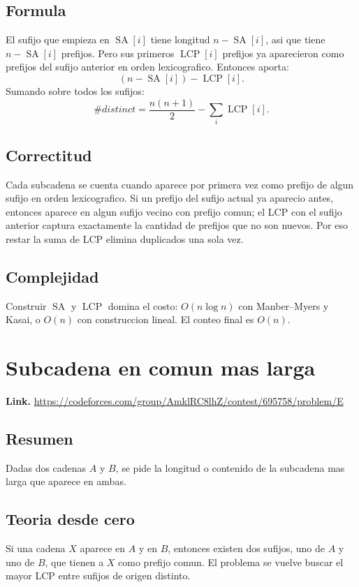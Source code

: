 \documentclass[10pt]{article}
\newcommand{\bigO}{O}
\newcommand{\SA}{\operatorname{SA}}
\newcommand{\LCP}{\operatorname{LCP}}
\begin{document}
\subsection*{Formula}
El sufijo que empieza en $\SA[i]$ tiene longitud $n-\SA[i]$, asi que tiene
$n-\SA[i]$ prefijos. Pero sus primeros $\LCP[i]$ prefijos ya aparecieron como
prefijos del sufijo anterior en orden lexicografico. Entonces aporta:
\[
(n-\SA[i])-\LCP[i].
\]
Sumando sobre todos los sufijos:
\[
\#distinct = \frac{n(n+1)}2-\sum_i \LCP[i].
\]

\subsection*{Correctitud}
Cada subcadena se cuenta cuando aparece por primera vez como prefijo de algun
sufijo en orden lexicografico. Si un prefijo del sufijo actual ya aparecio antes,
entonces aparece en algun sufijo vecino con prefijo comun; el LCP con el sufijo
anterior captura exactamente la cantidad de prefijos que no son nuevos. Por eso
restar la suma de LCP elimina duplicados una sola vez.

\subsection*{Complejidad}
Construir $\SA$ y $\LCP$ domina el costo: $\bigO(n\log n)$ con Manber--Myers y
Kasai, o $\bigO(n)$ con construccion lineal. El conteo final es $\bigO(n)$.

\clearpage
\section{Subcadena en comun mas larga}
\textbf{Link.} \url{https://codeforces.com/group/AmklRC8lhZ/contest/695758/problem/E}

\subsection*{Resumen}
Dadas dos cadenas $A$ y $B$, se pide la longitud o contenido de la subcadena mas
larga que aparece en ambas.

\subsection*{Teoria desde cero}
Si una cadena $X$ aparece en $A$ y en $B$, entonces existen dos sufijos, uno de
$A$ y uno de $B$, que tienen a $X$ como prefijo comun. El problema se vuelve
buscar el mayor LCP entre sufijos de origen distinto.
\end{document}
